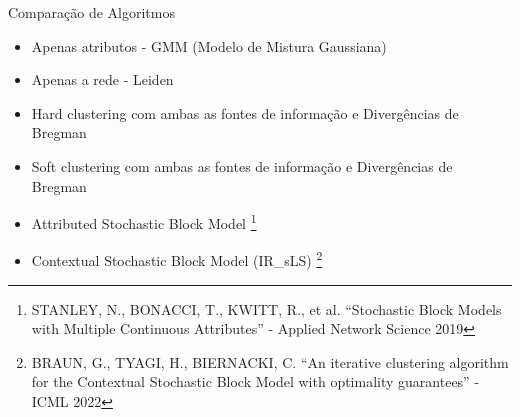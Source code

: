 \documentclass[aspectratio=169]{beamer}
\begin{document}
\begin{frame}{Comparação de Algoritmos}
    \begin{itemize}
        \item Apenas atributos - GMM (Modelo de Mistura Gaussiana)
        \item Apenas a rede - Leiden
        \item Hard clustering com ambas as fontes de informação e Divergências de Bregman
        \item Soft clustering com ambas as fontes de informação e Divergências de Bregman
        \item Attributed Stochastic Block Model \footnote{STANLEY, N., BONACCI, T., KWITT, R., et al. “Stochastic Block Models
        	with Multiple Continuous Attributes” - Applied Network Science 2019}
        \item Contextual Stochastic Block Model (IR\_sLS) \footnote{BRAUN, G., TYAGI, H., BIERNACKI, C. “An iterative clustering algorithm for the Contextual Stochastic Block Model with optimality guarantees” - ICML 2022}
    \end{itemize}
\end{frame}
\end{document}
